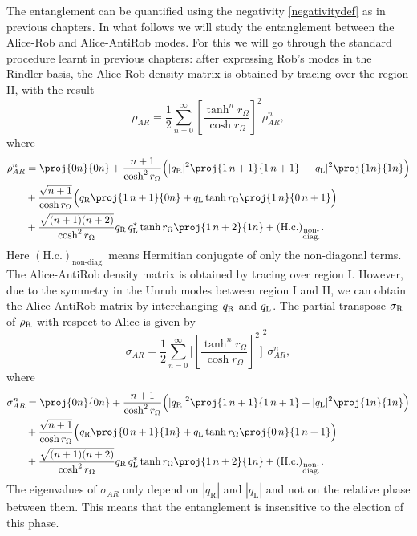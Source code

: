 The entanglement can be quantified using the negativity \eqref{negativitydef} as in previous chapters. In what follows we will study the entanglement between the Alice-Rob and Alice-AntiRob modes. For this we will go through the standard procedure learnt in previous chapters: after expressing Rob's modes in the Rindler basis, the Alice-Rob density matrix is obtained by tracing over the region II, with the result
\begin{equation}
\rho_{AR} = \frac{1}{2}\sum_{n=0}^\infty {\left[\frac{\tanh^n r_\Omega}{\cosh r_\Omega}\right]}^2 \rho_{AR}^n,
\end{equation}
where 
\begin{align}
\nonumber\rho_{AR}^n&=\proj{0n}{0n}+\frac{n+1}{\cosh^2r_{\Omega}}\Big(|q_\text{\text{R}}|^2\proj{1\,n+1}{1\,n+1}+|q_\text{\text{L}}|^2\proj{1n}{1n}\Big)\\*\nonumber&+\frac{\sqrt{n+1}}{\cosh r_{\Omega}}\Big(q_\text{\text{R}}\proj{1\,n+1}{0n}+ q_\text{\text{L}}\tanh r_{\Omega}\proj{1\,n}{0\, n+1}\Big)\\*&+\frac{\sqrt{(n+1)(n+2)}}{\cosh^2r_{\Omega}} q_\text{\text{R}}\,q_\text{\text{L}}^*\tanh r_{\Omega}\proj{1\, n+2}{1n}+(\text{H.c.})_{_{\substack{\text{non-}\\\text{diag.}}}}.
\end{align}
Here $(\text{H.c.})_{\text{non-diag.}}$ means Hermitian conjugate of only the non-diagonal terms. The Alice-AntiRob density matrix is obtained by tracing over region I. However, due to the symmetry in the Unruh modes between region I and II, we can obtain the Alice-AntiRob  matrix by interchanging $q_\text{\text{R}}$ and $q_\text{\text{L}}$.  The partial transpose $\sigma_\text{\text{R}}$ of $\rho_\text{\text{R}}$ with respect 
to Alice is given by
\begin{equation}
\sigma_{AR} = 
\frac{1}{2}
\sum_{n=0}^\infty {\big[{\left[\frac{\tanh^n r_\Omega}{\cosh r_\Omega}\right]}^2\big]}^2 \sigma^n_{AR},
\label{eq:sigmaR}
\end{equation}
where 
\begin{align}
\nonumber\sigma_{AR}^n&=\proj{0n}{0n}+\frac{n+1}{\cosh^2r_{\Omega}}\Big(|q_\text{\text{R}}|^2\proj{1\,n+1}{1\,n+1}+|q_\text{\text{L}}|^2\proj{1n}{1n}\Big)\\*
\nonumber&+\frac{\sqrt{n+1}}{\cosh r_{\Omega}}\Big(q_\text{\text{R}}\proj{0\,n+1}{1n}+ q_\text{\text{L}}\tanh r_{\Omega}\proj{0\,n}{1\, n+1}\Big)\\*
&+\frac{\sqrt{(n+1)(n+2)}}{\cosh^2r_{\Omega}} q_\text{\text{R}}\,q_\text{\text{L}}^*\tanh r_{\Omega}\proj{1\, n+2}{1n}+(\text{H.c.})_{_{\substack{\text{non-}\\\text{diag.}}}}.
\end{align}
 The eigenvalues of $\sigma_{AR}$ only depend on $|q_\text{R}|$ and $|q_\text{L}|$ and not on the relative phase between them. This means that the entanglement is insensitive to the election of this phase.

